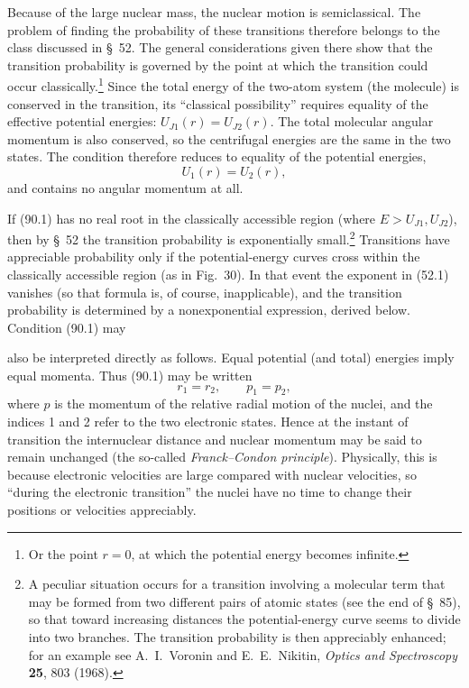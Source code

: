 Because of the large nuclear mass, the nuclear motion is semiclassical. The problem of finding the probability of these transitions therefore belongs to the class discussed in \S~52. The general considerations given there show that the transition probability is governed by the point at which the transition could occur classically.\footnote{Or the point $r=0$, at which the potential energy becomes infinite.} Since the total energy of the two-atom system (the molecule) is conserved in the transition, its ``classical possibility'' requires equality of the effective potential energies: $U_{J1}(r)=U_{J2}(r)$. The total molecular angular momentum is also conserved, so the centrifugal energies are the same in the two states. The condition therefore reduces to equality of the potential energies,
\begin{equation}U_1(r)=U_2(r),\tag{90.1}\end{equation}
and contains no angular momentum at all.

If (90.1) has no real root in the classically accessible region (where $E>U_{J1},U_{J2}$), then by \S~52 the transition probability is exponentially small.\footnote{A peculiar situation occurs for a transition involving a molecular term that may be formed from two different pairs of atomic states (see the end of \S~85), so that toward increasing distances the potential-energy curve seems to divide into two branches. The transition probability is then appreciably enhanced; for an example see A.~I.~Voronin and E.~E.~Nikitin, \emph{Optics and Spectroscopy} \textbf{25}, 803 (1968).} Transitions have appreciable probability only if the potential-energy curves cross within the classically accessible region (as in Fig.~30). In that event the exponent in (52.1) vanishes (so that formula is, of course, inapplicable), and the transition probability is determined by a nonexponential expression, derived below. Condition (90.1) may

also be interpreted directly as follows. Equal potential (and total) energies imply equal momenta. Thus (90.1) may be written
\begin{equation}r_1=r_2,\qquad p_1=p_2,\tag{90.2}\end{equation}
where $p$ is the momentum of the relative radial motion of the nuclei, and the indices 1 and 2 refer to the two electronic states. Hence at the instant of transition the internuclear distance and nuclear momentum may be said to remain unchanged (the so-called \emph{Franck--Condon principle}). Physically, this is because electronic velocities are large compared with nuclear velocities, so ``during the electronic transition'' the nuclei have no time to change their positions or velocities appreciably.

